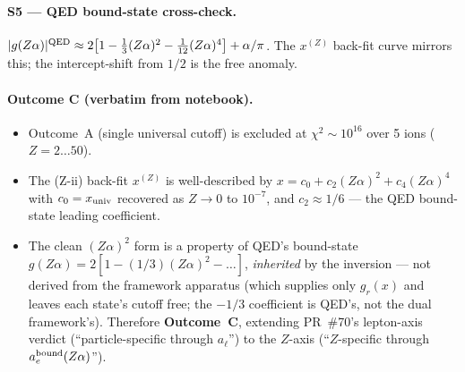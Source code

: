 \paragraph{S5 --- QED bound-state cross-check.}
$|g(Z\alpha)|^{\rm QED} \approx 2\bigl[1 - \tfrac{1}{3}(Z\alpha)^2
- \tfrac{1}{12}(Z\alpha)^4\bigr] + \alpha/\pi$.
The $x^{(Z)}$ back-fit curve mirrors this; the intercept-shift from $1/2$ is
the free anomaly.

\paragraph{Outcome C (verbatim from notebook).}
\begin{itemize}[topsep=2pt,itemsep=0pt]
  \item Outcome~A (single universal cutoff) is excluded at
        $\chi^2 \sim 10^{16}$ over 5 ions ($Z = 2 \ldots 50$).
  \item The (Z-ii) back-fit $x^{(Z)}$ is well-described by
        $x = c_0 + c_2 (Z\alpha)^2 + c_4 (Z\alpha)^4$ with $c_0 =
        x_{\rm univ}$ recovered as $Z\to 0$ to $10^{-7}$, and $c_2 \approx 1/6$
        --- the QED bound-state leading coefficient.
  \item The clean $(Z\alpha)^2$ form is a property of QED's bound-state
        $g(Z\alpha) = 2[1 - (1/3)(Z\alpha)^2 - \dots]$, \emph{inherited} by the
        inversion --- not derived from the framework apparatus (which supplies
        only $g_r(x)$ and leaves each state's cutoff free; the $-1/3$
        coefficient is QED's, not the dual framework's). Therefore
        \textbf{Outcome~C}, extending PR~\#70's lepton-axis verdict
        (``particle-specific through $a_\ell$'') to the $Z$-axis
        (``$Z$-specific through $a_e^{\rm bound}(Z\alpha)$'').
\end{itemize}

